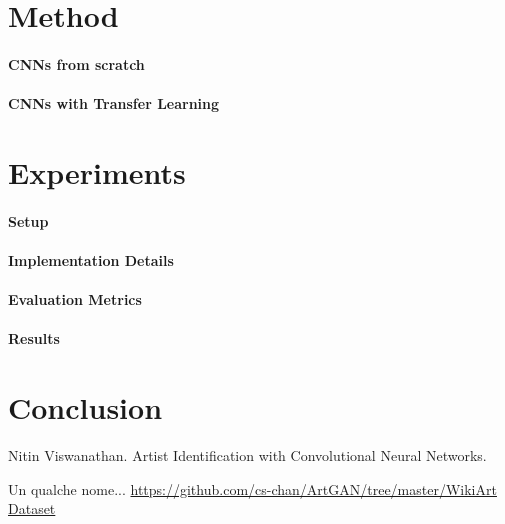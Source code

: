 \documentclass{article}
\begin{document}
\section{Method}

\paragraph{CNNs from scratch}

\paragraph{CNNs with Transfer Learning}


\section{Experiments}

\paragraph{Setup}

\paragraph{Implementation Details}

\paragraph{Evaluation Metrics}

\paragraph{Results}




\section{Conclusion}

\begin{thebibliography}{1}
	
	Nitin Viswanathan.
	\newblock Artist Identification with Convolutional Neural Networks. 
	
	Un qualche nome... \newblock
	\url{https://github.com/cs-chan/ArtGAN/tree/master/WikiArt Dataset}
	
\end{thebibliography}
\end{document}
